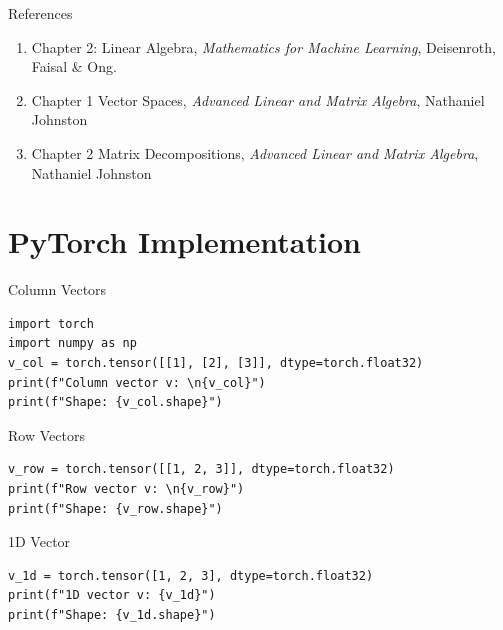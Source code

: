 \documentclass[aspectratio=169,xcolor=dvipsnames,svgnames,x11names,fleqn]{beamer}
\begin{document}
\begin{frame}{References}

    \begin{enumerate}
        \item Chapter 2: Linear Algebra, \textit{Mathematics for Machine Learning}, Deisenroth, Faisal \& Ong.
        \item Chapter 1 Vector Spaces, \textit{Advanced Linear and Matrix Algebra}, Nathaniel Johnston
        \item Chapter 2 Matrix Decompositions, \textit{Advanced Linear and Matrix Algebra}, Nathaniel Johnston
    \end{enumerate}
    
\end{frame}





\section{PyTorch Implementation}

\begin{frame}
    \sectionpage
\end{frame}

\begin{frame}[containsverbatim]{Column Vectors}
    
\begin{verbatim}
import torch
import numpy as np
v_col = torch.tensor([[1], [2], [3]], dtype=torch.float32)
print(f"Column vector v: \n{v_col}")
print(f"Shape: {v_col.shape}")
\end{verbatim}

\end{frame}


\begin{frame}[containsverbatim]{Row Vectors}
\begin{verbatim}
v_row = torch.tensor([[1, 2, 3]], dtype=torch.float32)
print(f"Row vector v: \n{v_row}")
print(f"Shape: {v_row.shape}")
\end{verbatim}
\end{frame}

\begin{frame}[containsverbatim]{1D Vector}
\begin{verbatim}
v_1d = torch.tensor([1, 2, 3], dtype=torch.float32)
print(f"1D vector v: {v_1d}")
print(f"Shape: {v_1d.shape}")

\end{verbatim}
\end{frame}
\end{document}
